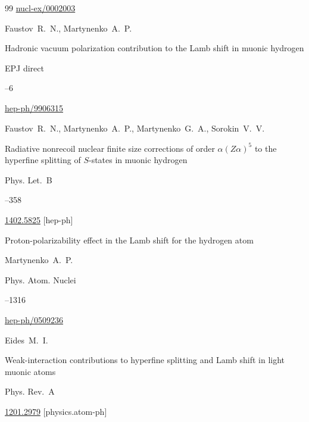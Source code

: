 \begin{thebibliography}{99}
\arxiv \href{http://arxiv.org/abs/nucl-ex/0002003}{nucl-ex/0002003}




\by Faustov~R.~N., Martynenko~A.~P.

\paper Hadronic vacuum polarization contribution to the Lamb shift in muonic hydrogen

\jour EPJ direct 




--6

\arxiv \href{http://arxiv.org/abs/hep-ph/9906315}{hep-ph/9906315}





\by Faustov~R.~N., Martynenko~A.~P., Martynenko~G.~A., Sorokin~V.~V.

\paper Radiative nonrecoil nuclear finite size corrections of order $\alpha(Z\alpha)^5$ to the hyperfine splitting of $S$-states in muonic hydrogen

\jour Phys. Let.~B



--358


\arxiv \href{http://arxiv.org/abs/1402.5825}{1402.5825} [hep-ph]




\paper Proton-polarizability effect in the Lamb shift for the hydrogen atom

\by Martynenko~A.~P.

\jour Phys. Atom. Nuclei




--1316

\arxiv \href{http://arxiv.org/abs/hep-ph/0509236}{hep-ph/0509236}





\by Eides~M.~I.

\paper Weak-interaction contributions to hyperfine splitting and Lamb shift in light muonic atoms

\jour Phys. Rev.~A






\arxiv \href{http://arxiv.org/abs/1201.2979}{1201.2979} [physics.atom-ph]



\end{thebibliography}
